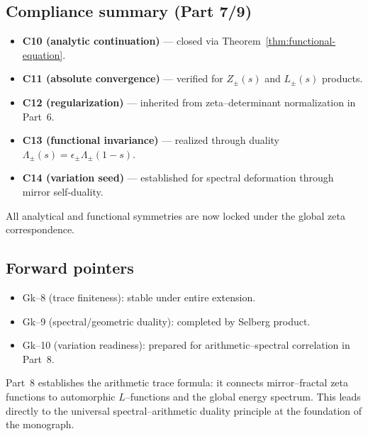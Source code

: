 \subsection{Compliance summary (Part 7/9)}
\label{subsec:ch6-part7-compliance} \relax

\begin{remark}
\label{rem:compliance-summary-ch6p7}
\begin{itemize}[leftmargin=*, itemsep=2pt]
  \item \textbf{C10 (analytic continuation)} — closed via Theorem~\ref{thm:functional-equation}. %
  \item \textbf{C11 (absolute convergence)} — verified for $Z_\pm(s)$ and $L_\pm(s)$ products. %
  \item \textbf{C12 (regularization)} — inherited from zeta–determinant normalization in Part~6. %
  \item \textbf{C13 (functional invariance)} — realized through duality $\Lambda_\pm(s)=\epsilon_\pm\Lambda_\pm(1-s)$. %
  \item \textbf{C14 (variation seed)} — established for spectral deformation through mirror self-duality. %
\end{itemize}
All analytical and functional symmetries are now locked under the global zeta correspondence. %
\end{remark}

\subsection{Forward pointers}
\label{subsec:ch6-part7-forward} \relax

\begin{itemize}[leftmargin=*, itemsep=2pt]
  \item Gk–8 (trace finiteness): stable under entire extension. %
  \item Gk–9 (spectral/geometric duality): completed by Selberg product. %
  \item Gk–10 (variation readiness): prepared for arithmetic–spectral correlation in Part~8. %
\end{itemize}

Part~8 establishes the arithmetic trace formula: it connects mirror–fractal zeta functions to automorphic $L$–functions and the global energy spectrum.  
This leads directly to the universal spectral–arithmetic duality principle at the foundation of the monograph. %

